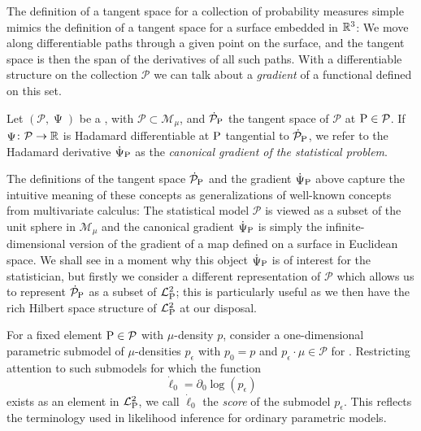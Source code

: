 \documentclass[a4,danish]{article}
\DeclareMathOperator{\TT}{\Psi}
\newcommand{\lp}{\mathcal{L}_{\P}^2} %
\begin{document}
The definition of a tangent space for a collection of probability measures simple mimics the
definition of a tangent space for a surface embedded in $\R^3$: We move along differentiable paths
through a given point on the surface, and the tangent space is then the span of the derivatives of
all such paths. With a differentiable structure on the collection $\mathcal{P}$ we can talk about a
\textit{gradient} of a functional defined on this set.

\begin{definition}
  Let $(\mathcal{P}, \TT)$ be a , with
  $\mathcal{P} \subset \mathcal{M}_{\mu}$, and $\dot{\mathcal{P}}_{\P}$ the tangent space of
  $\mathcal{P}$ at $\P \in \mathcal{P}$. If $\TT \colon \mathcal{P} \rightarrow \R$ is Hadamard
  differentiable at $\P$ tangential to $\dot{\mathcal{P}}_{\P}$, we refer to the Hadamard derivative
  $\dot{\TT}_{\P}$ as the \textit{canonical gradient of the statistical problem}.
\end{definition}


The definitions of the tangent space $\dot{\mathcal{P}}_{\P}$ and the gradient $\dot{\TT}_{\P}$
above capture the intuitive meaning of these concepts as generalizations of well-known concepts from
multivariate calculus: The statistical model $\mathcal{P}$ is viewed as a subset of the unit sphere
in $\mathcal{M}_{\mu}$ and the canonical gradient $\dot{\TT}_{\P}$ is simply the
infinite-dimensional version of the gradient of a map defined on a surface in Euclidean space. We
shall see in a moment why this object $\dot{\TT}_{\P}$ is of interest for the statistician, but
firstly we consider a different representation of $\mathcal{P}$ which allows us to represent
$\dot{\mathcal{P}}_{\P}$ as a subset of $\lp$; this is particularly useful as we then
have the rich Hilbert space structure of $\lp$ at our disposal.

For a fixed element $\P \in \mathcal{P}$ with $\mu$-density $p$, consider a one-dimensional
parametric submodel of $\mu$-densities $p_{\epsilon}$ with $p_0=p$ and
$p_{\epsilon} \cdot \mu \in \mathcal{P}$ for . Restricting
attention to such submodels for which the function
\begin{equation*}
  \dot{\ell}_0 = \partial_0 \log(p_{\epsilon})
\end{equation*}
exists as an element in $\lp$, we call $\dot{\ell}_0$ the \textit{score} of the
submodel $p_{\epsilon}$. This reflects the terminology used in likelihood inference for ordinary
parametric models.
\end{document}
